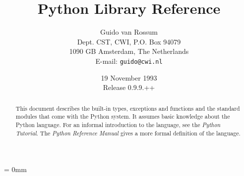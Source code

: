 %

\title{\bf
	Python Library Reference
}

\author{
	Guido van Rossum \\
	Dept. CST, CWI, P.O. Box 94079 \\
	1090 GB Amsterdam, The Netherlands \\
	E-mail: {\tt guido@cwi.nl}
}

\date{19 November 1993 \\ Release 0.9.9.++} %

\makeindex


{}

\maketitle

\begin{abstract}

\noindent
This document describes the built-in types, exceptions and functions
and the standard modules that come with the Python system.  It assumes
basic knowledge about the Python language.  For an informal
introduction to the language, see the {\em Python Tutorial}.  The {\em
Python Reference Manual} gives a more formal definition of the
language.

\end{abstract}

\pagebreak

{
\parskip = 0mm
\tableofcontents
}

\pagebreak




